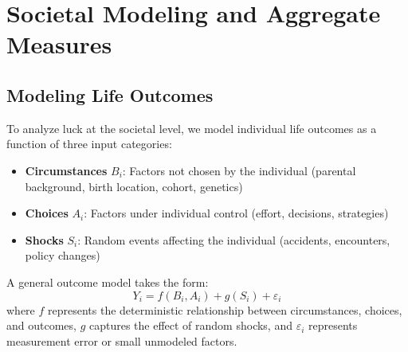 \section{Societal Modeling and Aggregate Measures}
\label{sec:society}

\subsection{Modeling Life Outcomes}

To analyze luck at the societal level, we model individual life outcomes
as a function of three input categories:

\begin{itemize}
  \item \textbf{Circumstances} $B_{i}$: Factors not chosen by the individual
    (parental background, birth location, cohort, genetics)

  \item \textbf{Choices} $A_{i}$: Factors under individual control (effort,
    decisions, strategies)

  \item \textbf{Shocks} $S_{i}$: Random events affecting the individual (accidents,
    encounters, policy changes)
\end{itemize}

A general outcome model takes the form:
\begin{equation}
  Y_{i}= f(B_{i}, A_{i}) + g(S_{i}) + \varepsilon_{i}
\end{equation}
where $f$ represents the deterministic relationship between
circumstances, choices, and outcomes, $g$ captures the effect of random shocks,
and $\varepsilon_{i}$ represents measurement error or small unmodeled
factors.

